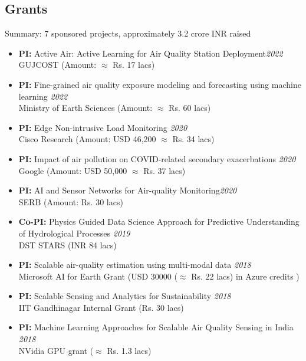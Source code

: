 \documentclass[letter,10pt]{article}
\begin{document}
\subsection*{\sc \textbf{Grants}\hspace{5pt}\noindent\hrulefill}
Summary: 7 sponsored projects, approximately 3.2 crore INR raised
\begin{itemize}
 \item[]{\textbf{PI: }Active Air: Active Learning for Air Quality Station Deployment}\hfill\textit{2022} \\
        GUJCOST (Amount: $\approx$ Rs. 17 lacs)
      \item[]{\textbf{PI: }Fine-grained air quality exposure modeling and forecasting using machine learning }\hfill\textit{2022} \\
        Ministry of Earth Sciences (Amount: $\approx$ Rs. 60 lacs)
    \item[]{\textbf{PI: }Edge Non-intrusive Load Monitoring  }\hfill\textit{2020} \\
    Cisco Research (Amount: USD 46,200 $\approx$ Rs. 34 lacs)
    \item[]{\textbf{PI: }Impact of air pollution on COVID-related secondary exacerbations  }\hfill\textit{2020} \\
    Google (Amount: USD 50,000 $\approx$ Rs. 37 lacs)
    \item[]{\textbf{PI: }AI and Sensor Networks for Air-quality Monitoring}\hfill\textit{2020} \\
    SERB (Amount: Rs. 30 lacs)
    
    \item[]{\textbf{Co-PI: }Physics Guided Data Science Approach for Predictive Understanding of Hydrological Processes }\hfill\textit{2019}\\
    DST STARS (INR 84 lacs)
    \item[]{\textbf{PI: }Scalable air-quality estimation using multi-modal data \hfill\textit{2018}\\Microsoft AI for Earth Grant (USD 30000 ($\approx$ Rs. 22 lacs) in Azure credits )} 
    \item[]{\textbf{PI: }Scalable Sensing and Analytics for Sustainability \hfill\textit{2018} \\
    IIT Gandhinagar Internal Grant (Rs. 30 lacs)} 
    \item[]{\textbf{PI: }Machine Learning Approaches for Scalable Air Quality Sensing in India} \hfill\textit{2018}\\
    NVidia GPU grant ($\approx$ Rs. 1.3 lacs)
    
\end{itemize}
\end{document}
